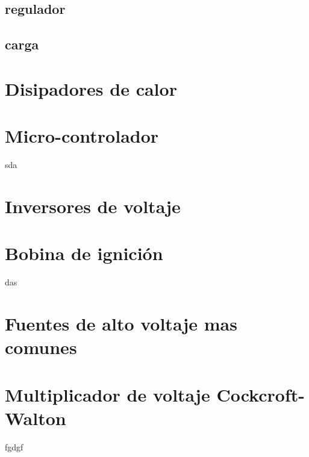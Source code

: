 \subsection{regulador}
\subsection{carga}


\newpage
\section{Disipadores de calor}
\section{Micro-controlador}
sda
\section{Inversores de voltaje}
\section{Bobina de ignición}
das
\section{Fuentes de alto voltaje mas comunes}


\section{Multiplicador de voltaje Cockcroft-Walton}
fgdgf